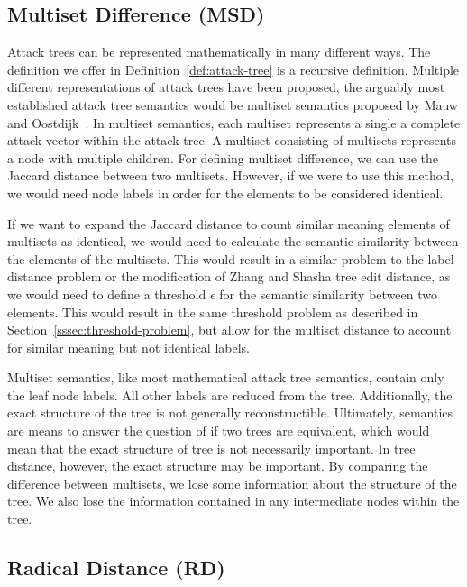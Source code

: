 \subsection{Multiset Difference (MSD)}

Attack trees can be represented mathematically in many different ways. The definition we offer in Definition~\ref{def:attack-tree} is a recursive definition. Multiple different representations of attack trees have been proposed, the arguably most established attack tree semantics would be multiset semantics proposed by Mauw and Oostdijk~\cite{mauw_foundations_2006}. In multiset semantics, each multiset represents a single a complete attack vector within the attack tree. A multiset consisting of multisets represents a node with multiple children. For defining multiset difference, we can use the Jaccard distance between two multisets. However, if we were to use this method, we would need node labels in order for the elements to be considered identical.

If we want to expand the Jaccard distance to count similar meaning elements of multisets as identical, we would need to calculate the semantic similarity between the elements of the multisets. This would result in a similar problem to the label distance problem or the modification of Zhang and Shasha tree edit distance, as we would need to define a threshold $\epsilon$ for the semantic similarity between two elements. This would result in the same threshold problem as described in Section~\ref{sssec:threshold-problem}, but allow for the multiset distance to account for similar meaning but not identical labels.

Multiset semantics, like most mathematical attack tree semantics, contain only the leaf node labels. All other labels are reduced from the tree. Additionally, the exact structure of the tree is not generally reconstructible. Ultimately, semantics are means to answer the question of if two trees are equivalent, which would mean that the exact structure of tree is not necessarily important. In tree distance, however, the exact structure may be important. By comparing the difference between multisets, we lose some information about the structure of the tree. We also lose the information contained in any intermediate nodes within the tree.



\subsection{Radical Distance (RD)}

